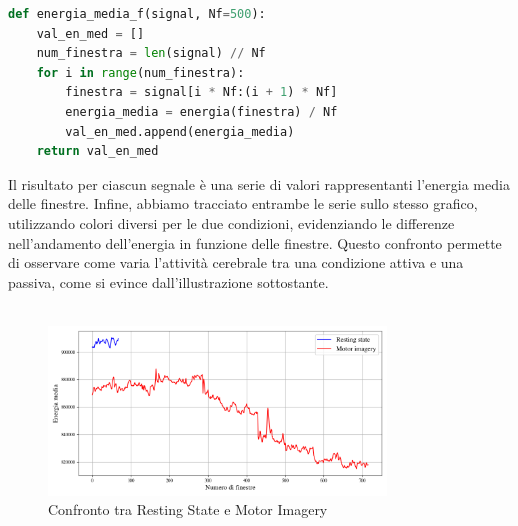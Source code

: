 \documentclass{report}
\begin{document}
\begin{lstlisting}[language=Python, xleftmargin=.2\textwidth]
def energia_media_f(signal, Nf=500):
    val_en_med = []
    num_finestra = len(signal) // Nf
    for i in range(num_finestra):
        finestra = signal[i * Nf:(i + 1) * Nf]
        energia_media = energia(finestra) / Nf
        val_en_med.append(energia_media)
    return val_en_med
\end{lstlisting}
\vspace{10pt}
\noindent Il risultato per ciascun segnale è una serie di valori rappresentanti l’energia media delle finestre. Infine, abbiamo tracciato entrambe le serie sullo stesso grafico, utilizzando colori diversi per le due condizioni, evidenziando le differenze nell’andamento dell’energia in funzione delle finestre. Questo confronto permette di osservare come varia l’attività cerebrale tra una condizione attiva e una passiva, come si evince dall'illustrazione sottostante.\\
\\
\noindent\begin{figure}[!h]
\centering
\includegraphics[width=0.8\textwidth]{plot6}
\caption{Confronto tra Resting State e Motor Imagery}
\end{figure}
\end{document}

